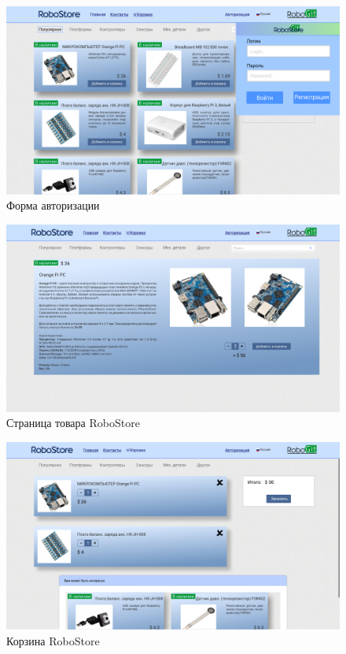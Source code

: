 \documentclass[12pt, a4paper]{article}
\begin{document}
\begin{figure}[H]
  \centering
  \includegraphics[width=17cm]{png/store_auth.png}
  \caption{Форма авторизации}
\end{figure}

\begin{figure}[H]
  \centering
  \includegraphics[width=17cm]{png/store_item.png}
  \caption{Страница товара RoboStore}
\end{figure}

\begin{figure}[H]
  \centering
  \includegraphics[width=17cm]{png/store_bin.png}
  \caption{Корзина RoboStore}
\end{figure}
\end{document}

